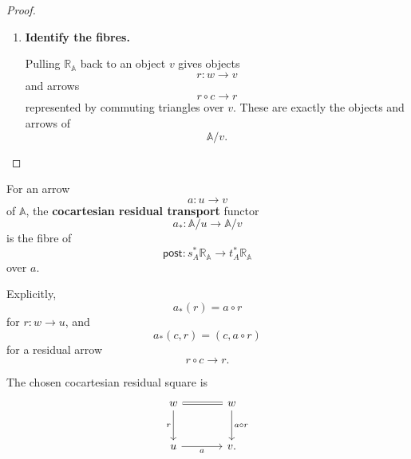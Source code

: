 \begin{proof}
\begin{enumerate}
        The two unit equations reduce to the unit equations in \(\mathbb A\).
        The associativity equation reduces to associativity in \(\mathbb A\)
        on a string
        \[
            x\longrightarrow y\longrightarrow z
            \longrightarrow w\longrightarrow v.
        \]
        Therefore \(\mathbb R_{\mathbb A}\) is an internal category in
        \(\mathcal E/A_0\).

        \item \textbf{Identify the fibres.}

        Pulling \(\mathbb R_{\mathbb A}\) back to an object \(v\) gives
        objects
        \[
            r:w\to v
        \]
        and arrows
        \[
            r\circ c\to r
        \]
        represented by commuting triangles over \(v\). These are exactly the
        objects and arrows of
        \[
            \mathbb A/v.
        \]
    \end{enumerate}
\end{proof}

\begin{definition}
\label{def:residual-transport}
    For an arrow
    \[
        a:u\to v
    \]
    of \(\mathbb A\), the \textbf{cocartesian residual transport} functor
    \[
        a_*:\mathbb A/u\to\mathbb A/v
    \]
    is the fibre of
    \[
        \mathsf{post}:
        s_A^*\mathbb R_{\mathbb A}
        \longrightarrow
        t_A^*\mathbb R_{\mathbb A}
    \]
    over \(a\).

    Explicitly,
    \[
        a_*(r)=a\circ r
    \]
    for \(r:w\to u\), and
    \[
        a_*(c,r)=(c,a\circ r)
    \]
    for a residual arrow
    \[
        r\circ c\to r.
    \]
\end{definition}

The chosen cocartesian residual square is
\[
    \begin{tikzcd}[column sep=large, row sep=large]
            w
                \arrow[r, equal]
                \arrow[d, "r"']
        &
            w
                \arrow[d, "a\circ r"]
        \\
            u
                \arrow[r, "a"']
        &
            v.
    \end{tikzcd}
\]

